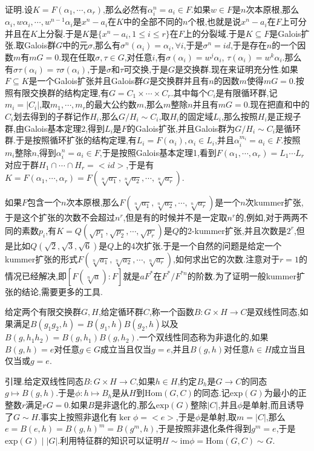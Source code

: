 证明.设$K=F(\alpha_1,\cdots,\alpha_r)$,那么必然有$\alpha_i^n=a_i\in F$.如果$w\in F$是$n$次本原根,那么$\alpha_i,w\alpha_i,\cdots,w^{n-1}\alpha_i$是$x^n-a_i$在$K$中的全部不同的$n$个根,也就是说$x^n-a_i$在$F$上可分并且在$K$上分裂.于是$K$是$\{x^n-a_i,1\le i\le r\}$在$F$上的分裂域.于是$K\subseteq F$是Galois扩张.取Galois群$G$中的元$\sigma$,那么有$\sigma^n(\alpha_i)=\alpha_i,\forall i$,于是$\sigma^n=id$,于是存在$n$的一个因数$m$有$mG=0$.现在任取$\sigma,\tau\in G$,对任意$i$,有$\sigma(\alpha_i)=w^j\alpha_i$, $\tau(\alpha_i)=w^k\alpha_i$.那么有$\sigma\tau(\alpha_i)=\tau\sigma(\alpha_i)$,于是$\sigma$和$\tau$可交换,于是$G$是交换群.现在来证明充分性.如果$F\subseteq K$是一个Galois扩张并且Galois群$G$是交换群并且有$n$的因数$m$使得$mG=0$.按照有限交换群的结构定理,有$G=C_1\times\cdots\times C_r$.其中每个$C_i$是有限循环群,记$m_i=|C_i|$,取$m_1,\cdots,m_r$的最大公约数$m$,那么$m$整除$n$并且有$mG=0$.现在把直和中的$C_i$划去得到的子群记作$H_i$,那么$G/H_i\sim C_i$,取$H_i$的固定域$L_i$,那么按照$H_i$是正规子群,由Galois基本定理2,得到$L_i$是$F$的Galois扩张,并且Galois群为$G/H_i\sim C_i$是循环群.于是按照循环扩张的结构定理,有$L_i=F(\alpha_i),\alpha_i\in L_i$,并且$\alpha_i^ {m_i}=a_i\in F$.按照$m_i$整除$n$,得到$\alpha_i^n=a_i\in F$,于是按照Galois基本定理1,看到$F(\alpha_1,\cdots,\alpha_r)=L_1\cdots L_r$对应于群$H_1\cap\cdots\cap H_r=<id>$,于是有$K=F(\alpha_1,\cdots,\alpha_r)=F(\sqrt[n]{a_1},\sqrt[n]{a_2},\cdots,\sqrt[n]{a_r})$.

如果$F$包含一个$n$次本原根,那么$F(\sqrt[n]{a_1},\sqrt[n]{a_2},\cdots,\sqrt[n]{a_r})$是一个$n$次kummer扩张,于是这个扩张的次数不会超过$n^r$,但是有的时候并不是一定取$n^r$的,例如,对于两两不同的素数$p_i$,有$K=Q(\sqrt{p_1},\sqrt{p_2},\cdots,\sqrt{p_r})$是$Q$的2-kummer扩张,并且次数是$2^r$,但是比如$Q(\sqrt{2},\sqrt{3},\sqrt{6})$是$Q$上的4次扩张.于是一个自然的问题是给定一个kummer扩张的形式$F(\sqrt[n]{a_1},\sqrt[n]{a_2},\cdots,\sqrt[n]{a_r})$,如何求出它的次数.注意对于$r=1$的情况已经解决,即$[F(\sqrt[n]{a}):F]$就是$aF^*$在$F^*/F^{*n}$的阶数.为了证明一般kummer扩张的结论,需要更多的工具.

给定两个有限交换群$G,H$,给定循环群$C$,称一个函数$B:G\times H\to C$是双线性同态,如果满足$B(g_1g_2,h)=B(g_1,h)B(g_2,h)$以及$B(g,h_1h_2)=B(g,h_1)B(g,h_2)$.一个双线性同态称为非退化的,如果$B(g,h)=e$对任意$g\in G$成立当且仅当$g=e$,并且$B(g,h)$对任意$h\in H $成立当且仅当或$g=e$.

引理.给定双线性同态$B:G\times H\to C$,如果$h\in H$,约定$B_h$是$G\to C$的同态$g\mapsto B(g,h)$.于是$\phi:h\mapsto B_h$是从$H$到$\mathrm{Hom}(G,C)$的同态.记$\mathrm{exp}(G)$为最小的正整数$r$满足$rG=0$.如果$B$是非退化的,那么$\mathrm{exp}(G)$整除$|C|$,并且$\phi$是单射,而且诱导了$G\sim H$.事实上按照非退化有$\ker\phi=<e>$,于是$\phi$是单射,取$m=|C|$,那么$e=B(e,h)=B(g,h)^m=B(g^m,h)$,于是按照非退化条件得到$g^m=e$,于是$\mathrm{exp}(G)\mid |G|$.利用特征群的知识可以证明$H\sim\mathrm{im}\phi=\mathrm{Hom}(G,C)\sim G$.


